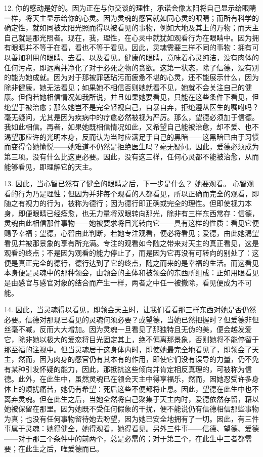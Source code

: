 12. 你的感动是好的。因为正在与你交谈的理性，承诺会像太阳将自己显示给眼睛一样，将天主显示给你的心灵。因为灵魂的感官就如同心灵的眼睛；而所有科学的确定性，就如同被太阳光照而得以被看见的事物，例如大地及其上的万物；而天主自己就是那光照者。现在，我，理性，在心灵中就犹如观看行为在眼睛中。因为拥有眼睛并不等于在看，看也不等于看见。因此，灵魂需要三样不同的事物：拥有可以善加利用的眼睛、去看、以及看见。健康的眼睛，意味着心灵纯洁，没有肉体的任何污点，即远离并净化了对于必死之物的贪欲。这第一状态，除了信德，没有别的能为她成就。因为对于那被罪恶玷污而疲惫不堪的心灵，还不能展示什么，因为除非健康，她无法看见；如果她不相信否则她就看不见，她就不会关注自己的健康。但倘若她相信情况如我所说，并且如果她要看见，只能在这些条件下看见，但绝望于被治愈；那么她岂不是完全轻视自己，自暴自弃，拒绝遵从医生的嘱咐吗？毫无疑问，尤其是因为疾病中的疗愈必然被视为严厉。那么，望德必须加于信德。我如此相信。再者，如果她既相信情况如此，又希望自己能被治愈，却不爱、也不渴望那应许的光明本身，反而认为当时应满足于自己的黑暗——这黑暗已由于习惯而变得令她愉悦——她难道不仍然是拒绝医生吗？毫无疑问。因此，爱德必须成为第三项。没有什么比这更必要。因此，没有这三样，任何心灵都不能被治愈，从而能够看见，即理解它的天主。\par

13. 因此，当心智已然有了健全的眼睛之后，下一步是什么？ 她要观看。 心智观看的行为乃是理性；但因为并非每个观看的人都看见，所以正确而完全的观看，即随之有视力的行为，被称为德行；因为德行即正确或完全的理性。但即使视力本身，即便眼睛已经痊愈，也无力量将双眼转向那光，除非有三样东西常存：信德，灵魂由此相信那件事物——她被要求将目光转向它——具有这样的性质：看见它便赐予幸福；望德，心智由此判断，若她专注观看，便必将看见；爱德，由此她渴望看见并被那景象的享有所充满。专注的观看如今随之带来对天主的真正看见，这是观看的终点；不是因为观看的能力停止了，而是因为它再没有可转向的别处了：这便是真正完全的德行，德行达到了它的终点，随之而来的是幸福的生活。而这看见本身便是灵魂中的那种领会，由领会的主体和被领会的东西所组成：正如用眼看见是由感官与感官对象的结合而产生一样，两者之中任一被撤除，看见便成为不可能。\par

14. 因此，当灵魂得以看见，即领会天主时，让我们看看那三样东西对她是否仍然必要。信德对那现已看见的灵魂何须必要？或望德，当她已然把握时？但爱德非但丝毫不减，反而大大增加。因为灵魂一旦看见了那独特且无伪的美，便会越发爱它，除非她以极大的爱恋将目光固定其上，绝不偏离那景象，否则她将不能停留于那至福的注视中。但当灵魂居于这身体内时，即使她最完全地看见了，即领会了天主，然而，因为肉身的感官仍有其本有的作用，即使它们没有误导的力量，仍不免有某种引发怀疑的能力，因此，那抵抗这些倾向并肯定相反真理的，可被称为信德。此外，在此生中，虽然灵魂已在领会天主中得享福乐，然而，因她忍受许多身体上的烦扰痛苦，她仍有希望：死后这些不便都将止息。因此，望德在此生中也不离弃灵魂。但在此生之后，当她全然将自己聚集于天主内时，爱德依然存留，藉以她被保留在那里。因为她既不受任何假象的干扰，便不能说仍有信德相信那些事物为真；也没有任何事物留待她去盼望，因为她已安全地拥有了一切。因此，有三件事属于灵魂：她得健全，她得观看，她得看见。另外三件事——信德、望德、爱德——对于那三个条件中的前两个，总是必需的；对于第三个，在此生中三者都需要；在此生之后，唯爱德而已。\par

